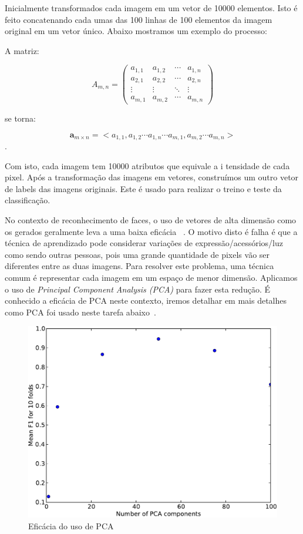 \documentclass[brazil,a4paper,12pt]{article}
\begin{document}
Inicialmente transformados cada imagem em um vetor de 10000 elementos. Isto é
feito concatenando cada umas das 100 linhas de 100 elementos da imagem original
em um vetor único. Abaixo mostramos um exemplo do processo:

A matriz:

\[
 A_{m,n} =
 \begin{pmatrix}
  a_{1,1} & a_{1,2} & \cdots & a_{1,n} \\
  a_{2,1} & a_{2,2} & \cdots & a_{2,n} \\
  \vdots  & \vdots  & \ddots & \vdots  \\
  a_{m,1} & a_{m,2} & \cdots & a_{m,n}
 \end{pmatrix}
\]

\noindent se torna:

\[
\mathbf{a}_{m \times n} =
<a_{1,1}, a_{1,2} \cdots a_{1,n} \cdots a_{m,1}, a_{m,2} \cdots a_{m,n}>
\]
.

\noindent Com isto, cada imagem tem 10000 atributos que equivale a 
i tensidade de cada pixel. Após a transformação das imagens em vetores,
construímos um outro vetor de labels das imagens originais. Este é
usado para realizar o treino e teste da classificação.

No contexto de reconhecimento de faces, o uso de vetores de alta 
dimensão como os gerados geralmente leva a uma baixa eficácia
~\cite{turk1991eigenfaces}. O motivo disto é falha é que a técnica
de aprendizado pode considerar variações de expressão/acessórios/luz como
sendo outras pessoas, pois uma grande quantidade de pixels vão ser
diferentes entre as duas imagens. Para resolver este problema, uma técnica
comum é representar cada imagem em um espaço de menor dimensão. Aplicamos
o uso de {\it Principal Component Analysis (PCA)} para fazer esta redução.
É conhecido a eficácia de PCA neste contexto, iremos detalhar em mais detalhes
como PCA foi usado neste tarefa abaixo~\cite{turk1991eigenfaces}.

\begin{figure}
\centering
\includegraphics[scale=0.6]{pca-crop.pdf}
\caption{Eficácia do uso de PCA}
\label{fig:groups}
\end{figure}
\end{document}
